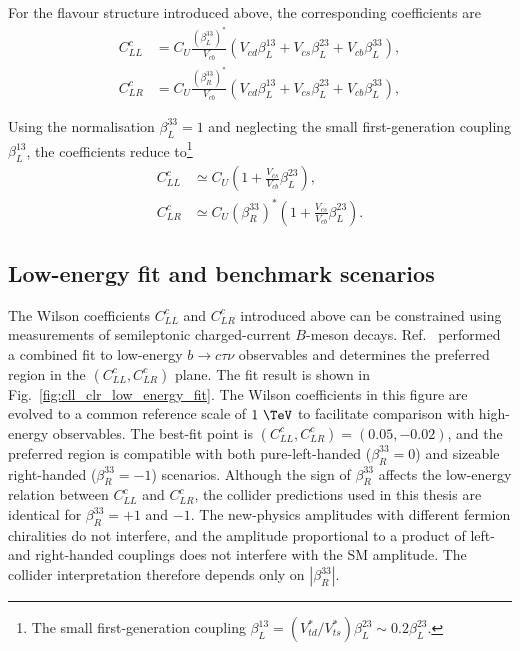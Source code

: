 For the flavour structure introduced above, the corresponding coefficients
are
\begin{align}
    C_{LL}^{c}
    &=
    C_{U}
    \frac{
        \left(\beta_{L}^{33}\right)^{*}
    }{
        V_{cb}
    }
    \left(
        V_{cd}\beta_{L}^{13}
        +
        V_{cs}\beta_{L}^{23}
        +
        V_{cb}\beta_{L}^{33}
    \right),
    \label{eq:cll_c}
    \\
    C_{LR}^{c}
    &=
    C_{U}
    \frac{
        \left(\beta_{R}^{33}\right)^{*}
    }{
        V_{cb}
    }
    \left(
        V_{cd}\beta_{L}^{13}
        +
        V_{cs}\beta_{L}^{23}
        +
        V_{cb}\beta_{L}^{33}
    \right),
    \label{eq:clr_c}
\end{align}

Using the normalisation $\beta_{L}^{33}=1$ and neglecting the small
first-generation coupling $\beta_{L}^{13}$, the coefficients reduce to\footnote{The small first-generation coupling $\beta_L^{13}=(V_{td}^{*}/V_{ts}^{*})\beta_L^{23}\sim0.2\beta_L^{23}$.}
\begin{align}
    C_{LL}^{c}
    &\simeq
    C_{U}
    \left(
        1+
        \frac{V_{cs}}{V_{cb}}\beta_{L}^{23}
    \right),
    \label{eq:cll_c_approx}
    \\
    C_{LR}^{c}
    &\simeq
    C_{U}
    \left(\beta_{R}^{33}\right)^{*}
    \left(
        1+
        \frac{V_{cs}}{V_{cb}}\beta_{L}^{23}
    \right).
    \label{eq:clr_c_approx}
\end{align}

\subsection{Low-energy fit and benchmark scenarios}
\label{subsec:u1_low_energy_fit}

The Wilson coefficients $C_{LL}^{c}$ and $C_{LR}^{c}$ introduced above can be constrained using measurements of semileptonic charged-current $B$-meson decays. Ref.~\cite{Aebischer2022} performed a combined fit to low-energy $b\rightarrow c\tau\nu$ observables and determines the preferred region in the $(C_{LL}^{c},C_{LR}^{c})$ plane. The fit result is shown in Fig.~\ref{fig:cll_clr_low_energy_fit}. The Wilson coefficients in this figure are evolved to a common reference scale of $1~\TeV$ to facilitate comparison with high-energy observables. The best-fit point is $(C_{LL}^{c}, C_{LR}^{c})=(0.05,-0.02)$, and the preferred region is compatible with both pure-left-handed ($\beta_{R}^{33}=0$) and sizeable right-handed ($\beta_{R}^{33}=-1$) scenarios.
Although the sign of $\beta_R^{33}$ affects the low-energy relation between $C_{LL}^{c}$ and $C_{LR}^{c}$, the collider predictions used in this thesis are identical for $\beta_R^{33}=+1$ and $-1$. The new-physics amplitudes with different fermion chiralities do not interfere, and the amplitude proportional to a product of left- and right-handed couplings does not interfere with the SM amplitude. The collider interpretation therefore depends only on $|\beta_R^{33}|$.

